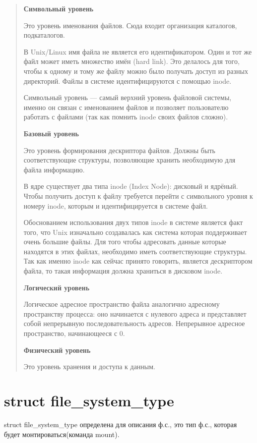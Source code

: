 \begin{quote}
\textbf{Символьный уровень}

Это уровень именования файлов. Сюда входит организация каталогов, подкаталогов.

В Unix/Linux имя файла не является его идентификатором. Один и тот же файл может иметь множество имён (hard link). Это делалось для того, чтобы к одному и тому же файлу можно было получать доступ из разных директорий. Файлы в системе идентифицируются с помощью inode.

Символьный уровень — самый верхний уровень файловой системы, именно он связан с именованием файлов и позволяет пользователю работать с файлами (так как помнить inode своих файлов сложно).

\textbf{Базовый уровень}


Это уровень формирования дескриптора файлов. Должны быть соответствующие структуры, позволяющие хранить необходимую для файла информацию.

В ядре существует два типа inode (Index Node): дисковый и ядрёный. Чтобы получить доступ к файлу требуется перейти с символьного уровня к номеру inode, которым и идентифицируется в системе файл.

Обоснованием использования двух типов inode в системе является факт того, что Unix изначально создавалась как система которая поддерживает очень большие файлы. Для того чтобы адресовать данные которые находятся в этих файлах, необходимо иметь соответствующие структуры. Так как именно inode как сейчас принято говорить, является дескриптором файла, то такая информация должна храниться в дисковом inode.

\textbf{Логический уровень}

Логическое адресное пространство файла аналогично адресному пространству процесса: оно начинается с нулевого адреса и представляет собой непрерывную последовательность адресов. Непрерывное адресное пространство, начинающееся с 0.

\textbf{Физический уровень}

Это уровень хранения и доступа к данным.

\end{quote}

\section{struct file\_system\_type}

struct file\_system\_type определена для описания ф.с., это тип ф.с., которая будет монтироваться(команда mount). 

